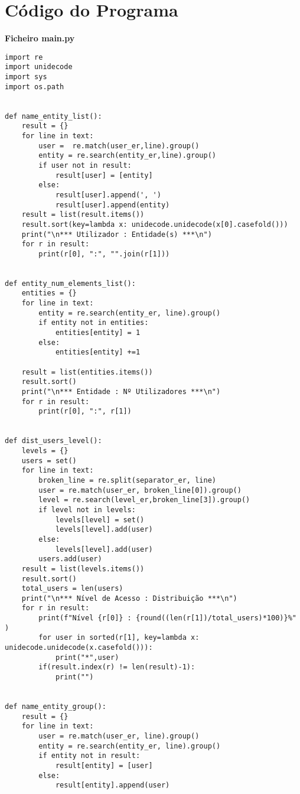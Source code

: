 \documentclass[11pt,a4paper]{report}%
\begin{document}

\appendix %
\chapter{Código do Programa}

\textbf{Ficheiro main.py}
\begin{scriptsize}
\begin{verbatim}
import re
import unidecode
import sys
import os.path


def name_entity_list():
    result = {}
    for line in text:
        user =  re.match(user_er,line).group()
        entity = re.search(entity_er,line).group()
        if user not in result:
            result[user] = [entity]
        else:
            result[user].append(', ')
            result[user].append(entity)
    result = list(result.items())
    result.sort(key=lambda x: unidecode.unidecode(x[0].casefold()))
    print("\n*** Utilizador : Entidade(s) ***\n")
    for r in result:
        print(r[0], ":", "".join(r[1]))


def entity_num_elements_list():
    entities = {}
    for line in text:
        entity = re.search(entity_er, line).group()
        if entity not in entities:
            entities[entity] = 1
        else:
            entities[entity] +=1

    result = list(entities.items())
    result.sort()
    print("\n*** Entidade : Nº Utilizadores ***\n")
    for r in result:
        print(r[0], ":", r[1])


def dist_users_level():
    levels = {}
    users = set()
    for line in text:
        broken_line = re.split(separator_er, line)
        user = re.match(user_er, broken_line[0]).group()
        level = re.search(level_er,broken_line[3]).group()
        if level not in levels:
            levels[level] = set()
            levels[level].add(user)
        else:
            levels[level].add(user)
        users.add(user)
    result = list(levels.items())
    result.sort()
    total_users = len(users)
    print("\n*** Nível de Acesso : Distribuição ***\n")
    for r in result:
        print(f"Nível {r[0]} : {round((len(r[1])/total_users)*100)}%" )
        for user in sorted(r[1], key=lambda x: unidecode.unidecode(x.casefold())):
            print("*",user)
        if(result.index(r) != len(result)-1):
            print("")


def name_entity_group():
    result = {}
    for line in text:
        user = re.match(user_er, line).group()
        entity = re.search(entity_er, line).group()
        if entity not in result:
            result[entity] = [user]
        else:
            result[entity].append(user)


\end{verbatim}
\end{scriptsize}
\end{document}
